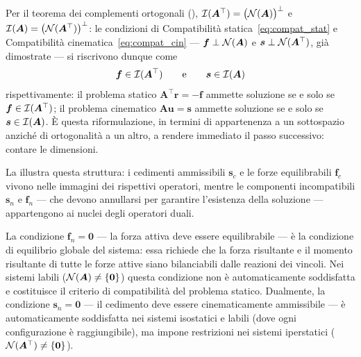 Per il teorema dei complementi ortogonali (),
$\mathcal{I}(\bm A^\top)=\big(\mathcal{N}(\bm A)\big)^\perp$ e
$\mathcal{I}(\bm A)=\big(\mathcal{N}(\bm A^\top)\big)^\perp$: le condizioni di
Compatibilità statica~\eqref{eq:compat_stat} e Compatibilità
cinematica~\eqref{eq:compat_cin} --- $\bm f\perp\mathcal{N}(\bm A)$ e
$\bm s\perp\mathcal{N}(\bm A^\top)$, già dimostrate --- si riscrivono dunque
come
\begin{equation}\label{eq:compat_via_im}
	\bm f\in\mathcal{I}(\bm A^\top)
	\qquad\text{e}\qquad
	\bm s\in\mathcal{I}(\bm A)
\end{equation}
rispettivamente: il problema statico $\bm A^\top\bm r=-\bm f$ ammette
soluzione se e solo se $\bm f\in\mathcal{I}(\bm A^\top)$; il problema
cinematico $\bm A\bm u=\bm s$ ammette soluzione se e solo se
$\bm s\in\mathcal{I}(\bm A)$. È questa riformulazione, in termini di
appartenenza a un sottospazio anziché di ortogonalità a un altro, a
rendere immediato il passo successivo: contare le dimensioni.



La  illustra questa struttura: i cedimenti
ammissibili $\bm{s}_c$ e le forze equilibrabili $\bm{f}_c$ vivono nelle immagini
dei rispettivi operatori, mentre le componenti incompatibili $\bm{s}_n$ e
$\bm{f}_n$ --- che devono annullarsi per garantire l'esistenza della soluzione
--- appartengono ai nuclei degli operatori duali.






\begin{oss}
	La condizione $\bm{f}_n = \bm{0}$ --- la forza attiva deve essere
	equilibrabile --- è la condizione di equilibrio globale del sistema:
	essa richiede che la forza risultante e il momento risultante di tutte
	le forze attive siano bilanciabili dalle reazioni dei vincoli. Nei
	sistemi labili ($\mathcal{N}(\bm{A}) \neq \{\bm{0}\}$) questa condizione non è
	automaticamente soddisfatta e costituisce il criterio di compatibilità
	del problema statico. Dualmente, la condizione $\bm{s}_n = \bm{0}$ ---
	il cedimento deve essere cinematicamente ammissibile --- è automaticamente
	soddisfatta nei sistemi isostatici e labili (dove ogni configurazione è
	raggiungibile), ma impone restrizioni nei sistemi iperstatici
	($\mathcal{N}(\bm{A}^\top) \neq \{\bm{0}\}$).
\end{oss}

